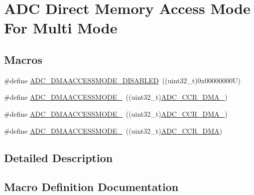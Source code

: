 \hypertarget{group___a_d_c_ex___direct__memory__access__mode__for__multi__mode}{}\section{A\+DC Direct Memory Access Mode For Multi Mode}
\label{group___a_d_c_ex___direct__memory__access__mode__for__multi__mode}
\subsection*{Macros}
\begin{DoxyCompactItemize}
\item 
\#define \mbox{\hyperlink{group___a_d_c_ex___direct__memory__access__mode__for__multi__mode_ga59163da6d23f587f951ce21d74542795}{A\+D\+C\+\_\+\+D\+M\+A\+A\+C\+C\+E\+S\+S\+M\+O\+D\+E\+\_\+\+D\+I\+S\+A\+B\+L\+ED}}~((uint32\+\_\+t)0x00000000\+U)
\item 
\#define \mbox{\hyperlink{group___a_d_c_ex___direct__memory__access__mode__for__multi__mode_gadb55bb780e7c0a58878287f205f88e33}{A\+D\+C\+\_\+\+D\+M\+A\+A\+C\+C\+E\+S\+S\+M\+O\+D\+E\+\_}}~((uint32\+\_\+t)\mbox{\hyperlink{group___peripheral___registers___bits___definition_ga3a42ee6ec5115244aef8f60d35abcc47}{A\+D\+C\+\_\+\+C\+C\+R\+\_\+\+D\+M\+A\+\_}})
\item 
\#define \mbox{\hyperlink{group___a_d_c_ex___direct__memory__access__mode__for__multi__mode_ga33b7e654725c8de70c9ca5a1e1b3d139}{A\+D\+C\+\_\+\+D\+M\+A\+A\+C\+C\+E\+S\+S\+M\+O\+D\+E\+\_}}~((uint32\+\_\+t)\mbox{\hyperlink{group___peripheral___registers___bits___definition_gacdc9d29cafdd54e5c0dd752c358e1bc8}{A\+D\+C\+\_\+\+C\+C\+R\+\_\+\+D\+M\+A\+\_}})
\item 
\#define \mbox{\hyperlink{group___a_d_c_ex___direct__memory__access__mode__for__multi__mode_ga2613348408ee2a5685f1d06f6f7780dc}{A\+D\+C\+\_\+\+D\+M\+A\+A\+C\+C\+E\+S\+S\+M\+O\+D\+E\+\_}}~((uint32\+\_\+t)\mbox{\hyperlink{group___peripheral___registers___bits___definition_ga9e346b21afcaeced784e6c80b3aa1fb4}{A\+D\+C\+\_\+\+C\+C\+R\+\_\+\+D\+MA}})
\end{DoxyCompactItemize}


\subsection{Detailed Description}


\subsection{Macro Definition Documentation}
\mbox{\label{group___a_d_c_ex___direct__memory__access__mode__for__multi__mode_gadb55bb780e7c0a58878287f205f88e33}} 
